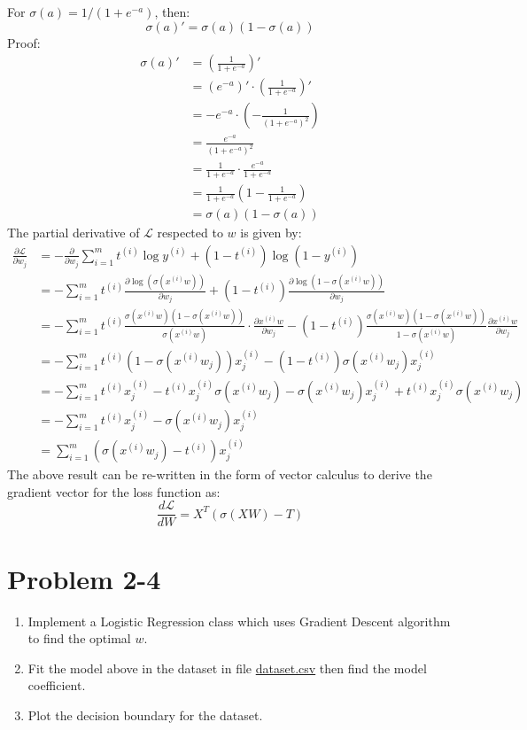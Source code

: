 \documentclass[a4paper, 12pt]{article}  %
\begin{document}
For $\sigma(a) = 1 / (1 + e^{-a})$, then: \[\sigma(a)' = \sigma(a)(1 - \sigma(a))\] Proof:
\begin{align*}
    \sigma(a)' &= \left(\frac{1}{1 + e^{-a}}\right)'\\
    &= (e^{-a})' \cdot \left(\frac{1}{1 + e^{-a}}\right)'\\
    &= -e^{-a} \cdot \left(- \frac{1}{(1 + e^{-a})^2} \right)\\
    &= \frac{e^{-a}}{(1 + e^{-a})^2}\\
    &= \frac{1}{1 + e^{-a}} \cdot \frac{e^{-a}}{1 + e^{-a}}\\
    &= \frac{1}{1 + e^{-a}} \left(1 - \frac{1}{1 + e^{-a}}\right) \\
    &= \sigma(a)(1 - \sigma(a))
\end{align*}
The partial derivative of $\mathcal{L}$ respected to $w$ is given by:
\begin{align*}
    \frac{\partial \mathcal{L} }{\partial w_j} &= -\frac{\partial}{\partial w_j} \sum^m_{i=1} t^{(i)} \log y^{(i)} + (1 - t^{(i)}) \log (1 - y^{(i)})\\
    &= -\sum^m_{i=1} t^{(i)} \frac{\partial \log (\sigma (x^{(i)} w))}{\partial w_j} + (1 - t^{(i)}) \frac{\partial \log (1 - \sigma(x^{(i)} w))}{\partial w_j} \\
    &= -\sum^m_{i=1} t^{(i)} \frac{\sigma (x^{(i)} w)(1 - \sigma (x^{(i)} w))}{\sigma (x^{(i)} w)} \cdot \frac{\partial x^{(i)} w}{\partial w_j} -(1-t^{(i)}) \frac{\sigma (x^{(i)} w)(1 - \sigma (x^{(i)} w))}{1 - \sigma (x^{(i)} w)} \frac{\partial x^{(i)} w}{\partial w_j} \\
    &= -\sum^m_{i=1} t^{(i)} (1 - \sigma (x^{(i)} w_j)) x^{(i)}_j - (1 - t^{(i)}) \sigma (x^{(i)} w_j) x^{(i)}_j \\
    &= -\sum^m_{i=1} t^{(i)} x^{(i)}_j - t^{(i)} x^{(i)}_j \sigma(x^{(i)} w_j) -\sigma(x^{(i)} w_j)x^{(i)}_j + t^{(i)} x^{(i)}_j \sigma(x^{(i)} w_j) \\
    &= -\sum^m_{i=1} t^{(i)} x^{(i)}_j -\sigma(x^{(i)} w_j)x^{(i)}_j \\
    &= \sum^m_{i=1} (\sigma(x^{(i)} w_j) - t^{(i)})x^{(i)}_j
\end{align*}
The above result can be re-written in the form of vector calculus to derive the gradient vector for the loss function as:
\[\frac{d \mathcal{L}}{d W} = X^T (\sigma(X W) - T)\]
    
\section{Problem 2-4}
\begin{enumerate}
    \item Implement a Logistic Regression class which uses Gradient Descent algorithm to find the optimal $w$.
    \item Fit the model above in the dataset in file \href{https://github.com/nttuan8/DL_Tutorial/blob/master/L2/dataset.csv}{dataset.csv} then find the model coefficient.
    \item Plot the decision boundary for the dataset.
\end{enumerate}
\end{document}

